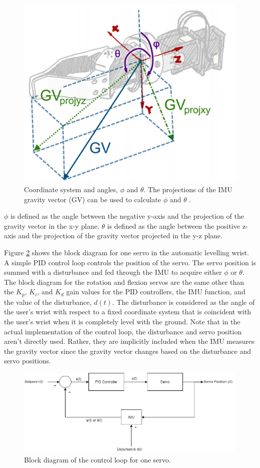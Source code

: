 \documentclass[letterpaper,12pt]{article}
\begin{document}
\begin{figure}[H]
\centering \includegraphics[width=0.8\columnwidth]{angles.png}
\caption{\label{fig:angles}Coordinate system and angles, $\phi$ and $\theta$. The projections of the IMU gravity vector (GV) can be used to calculate $\phi$ and $\theta$ \cite{d.j.a.brenneis}.}
\end{figure}

$\phi$ is defined as the angle between the negative y-axis and the projection of the gravity vector in the x-y plane. $\theta$ is defined as the angle between the positive z-axis and the projection of the gravity vector projected in the y-z plane.

Figure \ref{fig:servo_system} shows the block diagram for one servo in the automatic levelling wrist. A simple PID control loop controls the position of the servo. The servo position is summed with a disturbance and fed through the IMU to acquire either $\phi$ or $\theta$. The block diagram for the rotation and flexion servos are the same other than the $K_p$, $K_i$, and $K_d$ gain values for the PID controllers, the IMU function, and the value of the disturbance, $d(t)$. The disturbance is considered as the angle of the user's wrist with respect to a fixed coordinate system that is coincident with the user's wrist when it is completely level with the ground. Note that in the actual implementation of the control loop, the disturbance and servo position aren't directly used. Rather, they are implicitly included when the IMU measures the gravity vector since the gravity vector changes based on the disturbance and servo positions.

\begin{figure}[H]
\centering \includegraphics[width=0.8\columnwidth]{servo_system.png}
\caption{\label{fig:servo_system}Block diagram of the control loop for one servo.}
\end{figure}
\end{document}
